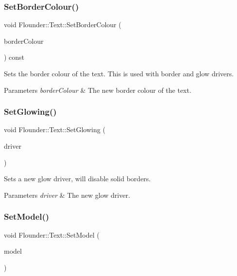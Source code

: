 \subsubsection{\texorpdfstring{Set\+Border\+Colour()}{SetBorderColour()}}
{\footnotesize\ttfamily void Flounder\+::\+Text\+::\+Set\+Border\+Colour (\begin{DoxyParamCaption}\item[{const \hyperlink{class_flounder_1_1_colour}{Colour} \&}]{border\+Colour }\end{DoxyParamCaption}) const\hspace{0.3cm}{\ttfamily [inline]}}



Sets the border colour of the text. This is used with border and glow drivers. 


\begin{DoxyParams}{Parameters}
{\em border\+Colour} & The new border colour of the text. \\
\hline
\end{DoxyParams}
\mbox{\label{class_flounder_1_1_text_ae0f1fef7f7af482213ad0c9ed9b4c00b}} 
\subsubsection{\texorpdfstring{Set\+Glowing()}{SetGlowing()}}
{\footnotesize\ttfamily void Flounder\+::\+Text\+::\+Set\+Glowing (\begin{DoxyParamCaption}\item[{\hyperlink{class_flounder_1_1_i_driver}{I\+Driver} $\ast$}]{driver }\end{DoxyParamCaption})}



Sets a new glow driver, will disable solid borders. 


\begin{DoxyParams}{Parameters}
{\em driver} & The new glow driver. \\
\hline
\end{DoxyParams}
\mbox{\label{class_flounder_1_1_text_ab0603f5d9e2b6895a8ea6a16db3789fc}} 
\subsubsection{\texorpdfstring{Set\+Model()}{SetModel()}}
{\footnotesize\ttfamily void Flounder\+::\+Text\+::\+Set\+Model (\begin{DoxyParamCaption}\item[{\hyperlink{class_flounder_1_1_model}{Model} $\ast$}]{model }\end{DoxyParamCaption})\hspace{0.3cm}{\ttfamily [inline]}}




